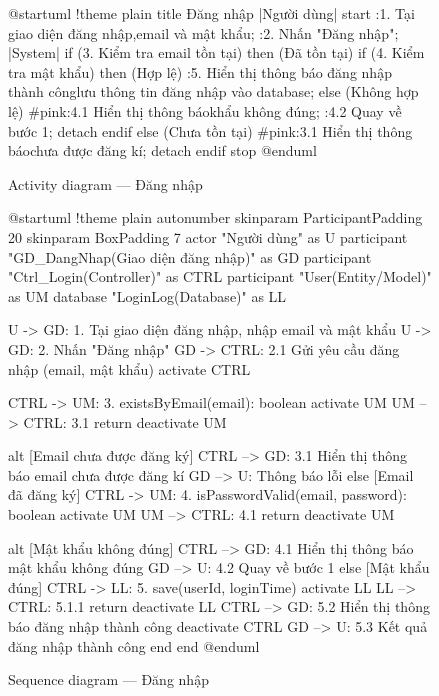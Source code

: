 \documentclass[12pt,a4paper]{report}
\begin{document}
\begin{figure}[H]
    \centering
    \begin{plantuml}
        @startuml
        !theme plain
        title Đăng nhập
        |Người dùng|
        start
        :1. Tại giao diện đăng nhập, email và mật khẩu;
        :2. Nhấn "Đăng nhập";
        |System|
        if (3. Kiểm tra email tồn tại) then (Đã tồn tại)
          if (4. Kiểm tra mật khẩu) then (Hợp lệ)
            :5. Hiển thị thông báo đăng nhập thành công lưu thông tin đăng nhập vào database;
          else (Không hợp lệ)
            #pink:4.1 Hiển thị thông báo khẩu không đúng;
            :4.2 Quay về bước 1;
            detach
          endif
        else (Chưa tồn tại)
          #pink:3.1 Hiển thị thông báo\nemail chưa được đăng kí;
          detach
        endif
        stop
        @enduml
    \end{plantuml}
    \caption{Activity diagram --- Đăng nhập}
\end{figure}

\begin{figure}[H]
    \centering
    \begin{plantuml}
        @startuml
        !theme plain
        autonumber
        skinparam ParticipantPadding 20
        skinparam BoxPadding 7
        actor "Người dùng" as U
        participant "GD_DangNhap\n(Giao diện đăng nhập)" as GD
        participant "Ctrl_Login\n(Controller)" as CTRL
        participant "User\n(Entity/Model)" as UM
        database "LoginLog\n(Database)" as LL

        U -> GD: 1. Tại giao diện đăng nhập, nhập email và mật khẩu
        U -> GD: 2. Nhấn "Đăng nhập"
        GD -> CTRL: 2.1 Gửi yêu cầu đăng nhập (email, mật khẩu)
        activate CTRL

        CTRL -> UM: 3. existsByEmail(email): boolean
        activate UM
        UM --> CTRL: 3.1 return
        deactivate UM

        alt [Email chưa được đăng ký]
          CTRL --> GD: 3.1 Hiển thị thông báo email chưa được đăng kí
          GD --> U: Thông báo lỗi
        else [Email đã đăng ký]
          CTRL -> UM: 4. isPasswordValid(email, password): boolean
          activate UM
          UM --> CTRL: 4.1 return
          deactivate UM

          alt [Mật khẩu không đúng]
            CTRL --> GD: 4.1 Hiển thị thông báo mật khẩu không đúng
            GD --> U: 4.2 Quay về bước 1
          else [Mật khẩu đúng]
            CTRL -> LL: 5. save(userId, loginTime)
            activate LL
            LL --> CTRL: 5.1.1 return
            deactivate LL
            CTRL --> GD: 5.2 Hiển thị thông báo đăng nhập thành công
            deactivate CTRL
            GD --> U: 5.3 Kết quả đăng nhập thành công
          end
        end
        @enduml
    \end{plantuml}
    \caption{Sequence diagram --- Đăng nhập}
\end{figure}
\end{document}
